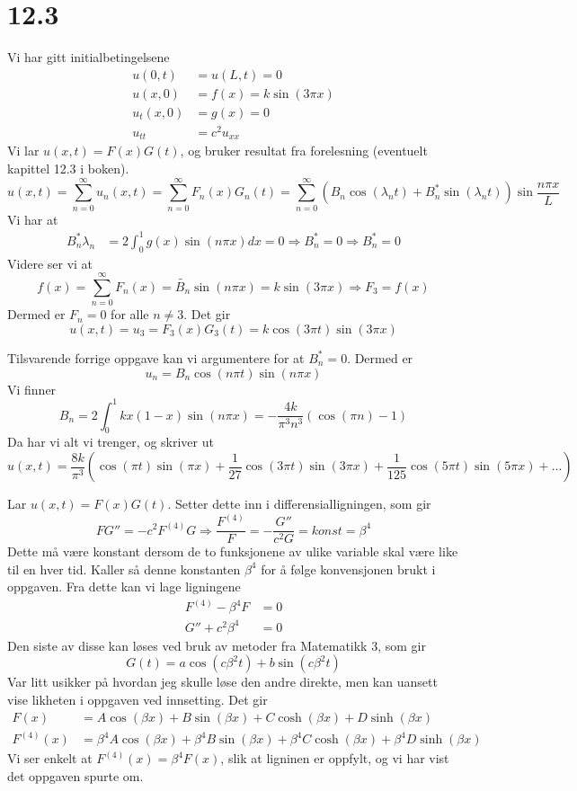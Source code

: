 \documentclass[11pt, a4paper, norsk]{NTNUoving}
\begin{document}
\section*{12.3}
\begin{oppgave}[5]
  Vi har gitt initialbetingelsene
  \begin{align*}
    u(0,t)&=u(L,t)=0\\
    u(x,0)&=f(x)=k\sin(3\pi x) \\
    u_{t}(x,0)&=g(x)=0\\
    u_{tt}&=c^2u_{xx}
  \end{align*}
  Vi lar $u(x,t)=F(x)G(t)$, og bruker resultat fra forelesning (eventuelt kapittel 12.3 i boken).
  \[
    u(x,t)=\sum_{n=0}^{\infty}u_n(x,t)=\sum_{n=0}^{\infty}F_n(x)G_n(t)=
    \sum_{n=0}^{\infty}(B_n\cos(\lambda_nt)+B_n^*\sin(\lambda_nt))\sin\frac{n\pi x}{L}
  \]
  Vi har at
  \begin{align*}
    B_n^*\lambda_n &= 2\int_0^1g(x)\sin(n\pi x) dx = 0 \Rightarrow B_n^*=0 \Rightarrow B_n^* = 0
  \end{align*}
  Videre ser vi at
  \[
    f(x)=\sum_{n=0}^{\infty}F_n(x)=\tilde{B_n}\sin(n\pi x) = k\sin(3\pi x) \Rightarrow F_3 = f(x)
  \]
  Dermed er $F_n=0$ for alle $n\neq 3$. Det gir
  \[
    u(x,t) = u_3=F_3(x)G_3(t) = k\cos(3\pi t)\sin(3\pi x)
  \]
\end{oppgave}
\begin{oppgave}[7]
  Tilsvarende forrige oppgave kan vi argumentere for at $B_n^*=0$. Dermed er
  \[
    u_n = B_n\cos(n\pi t)\sin(n\pi x)
  \]
  Vi finner
  \[
    B_n=2\int_0^1kx(1-x)\sin(n\pi x) = -\frac{4k}{\pi^3n^3}(\cos(\pi n)-1)
  \]
  Da har vi alt vi trenger, og skriver ut
  \[
    u(x,t)=\frac{8k}{\pi^3}\left(\cos(\pi t)\sin(\pi x) + \frac{1}{27}\cos(3\pi t)\sin(3\pi x) + \frac{1}{125}\cos(5\pi t)\sin(5\pi x) + ... \right)
  \]  
\end{oppgave}
\begin{oppgave}[15]
  Lar $u(x,t)=F(x)G(t)$. Setter dette inn i differensialligningen, som gir
  \[
    FG''=-c^2F^{(4)}G\Rightarrow \frac{F^{(4)}}{F} = -\frac{G''}{c^2G}=konst=\beta^4
  \]
  Dette må være konstant dersom de to funksjonene av ulike variable skal være like til en hver tid. Kaller så denne konstanten $\beta^4$ for å følge konvensjonen brukt i oppgaven.
  Fra dette kan vi lage ligningene
  \begin{align*}
    F^{(4)}-\beta^4F &= 0 \\
    G''+c^2\beta^4 &= 0
  \end{align*}
  Den siste av disse kan løses ved bruk av metoder fra Matematikk 3, som gir
  \[
    G(t) = a\cos(c\beta^2 t) + b\sin(c\beta^2 t)
  \]
  Var litt usikker på hvordan jeg skulle løse den andre direkte, men kan uansett vise likheten i oppgaven ved innsetting. Det gir
  \begin{align*}
    F(x) &= A\cos(\beta x) + B\sin(\beta x) + C\cosh(\beta x) + D\sinh(\beta x) \\
    F^{(4)}(x) &= \beta^4A\cos(\beta x) + \beta^4B\sin(\beta x) + \beta^4C\cosh(\beta x) + \beta^4D\sinh(\beta x)
  \end{align*}
  Vi ser enkelt at $F^{(4)}(x) = \beta^4 F(x)$, slik at ligninen er oppfylt, og vi har vist det oppgaven spurte om. 
\end{oppgave}
\end{document}
